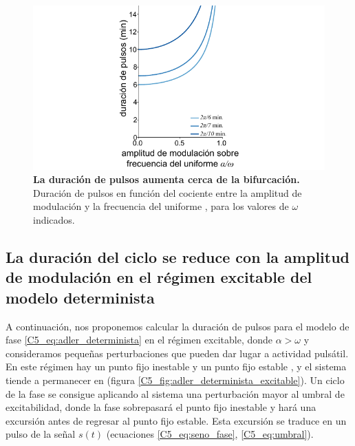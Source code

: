 { \begin{figure}
    \centering
    \includegraphics[width=1\columnwidth]{figures/chapter5/C5_T_osc.pdf} 
    \caption{\textbf{La duración de pulsos aumenta cerca de la bifurcación.} Duración de pulsos en función del cociente entre la amplitud de modulación y la frecuencia del uniforme \dddelta, para los valores de $\omega$ indicados.}
    \label{C5_fig:T_osc}
\end{figure}


\subsection{La duración del ciclo se reduce con la amplitud de modulación en el régimen excitable del modelo determinista}
\label{C5_sec:T_exc}

A continuación, nos proponemos calcular la duración de pulsos para el modelo de fase \ref{C5_eq:adler_determinista} en el régimen excitable, donde $\alpha > \omega$ y consideramos pequeñas perturbaciones que pueden dar lugar a actividad pulsátil. En este régimen hay un punto fijo inestable \xxi y un punto fijo estable \xxe, y el sistema tiende a permanecer en \xxe (figura \ref{C5_fig:adler_determinista_excitable}). Un ciclo de la fase \xx se consigue aplicando al sistema una perturbación mayor al umbral de excitabilidad, donde la fase sobrepasará el punto fijo inestable y hará una excursión antes de regresar al punto fijo estable. Esta excursión se traduce en un pulso de la señal $s(t)$ (ecuaciones \ref{C5_eq:seno_fase}, \ref{C5_eq:umbral}).



}
